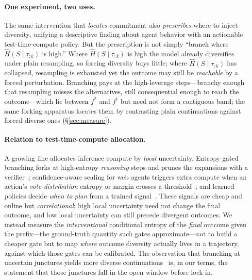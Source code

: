 \documentclass[11pt]{article}
\newcommand{\Hk}{\widehat{H}\!\left(S \mid \tau_{:k}\right)}
\begin{document}
\paragraph{One experiment, two uses.}
The same intervention that \emph{locates} commitment also \emph{prescribes} where
to inject diversity, unifying a descriptive finding about agent behavior with an
actionable test-time-compute policy. But the prescription is not simply ``branch
where $\Hk$ is high.'' Where $\Hk$ is high the model already diversifies under
plain resampling, so forcing diversity buys little; where $\Hk$ has collapsed,
resampling is exhausted yet the outcome may still be \emph{reachable} by a forced
perturbation. Branching pays at the high-leverage steps---branchy enough that
resampling misses the alternatives, still consequential enough to reach the
outcome---which lie between $f^\ast$ and $f^\dagger$ but need not form a contiguous
band; the same forking apparatus locates them by contrasting plain continuations
against forced-diverse ones
(\S\ref{sec:measure}).

\paragraph{Relation to test-time-compute allocation.}
A growing line allocates inference compute by \emph{local} uncertainty.
Entropy-gated branching forks at high-entropy \emph{reasoning} steps and prunes the
expansions with a verifier~\citep{egb2025}; confidence-aware scaling for web agents
triggers extra compute when an action's \emph{vote-distribution} entropy or margin
crosses a threshold~\citep{catts2026}; and learned policies decide \emph{when to
plan} from a trained signal~\citep{learnwhentoplan2025}. These signals are cheap and
online but \emph{correlational}: high local uncertainty need not change the final
outcome, and low local uncertainty can still precede divergent outcomes. We instead
measure the \emph{interventional} conditional entropy of the \emph{final} outcome
given the prefix---the ground-truth quantity such gates approximate---not to build a
cheaper gate but to map \emph{where} outcome diversity actually lives in a
trajectory, against which those gates can be calibrated. The observation that
branching at uncertain junctures yields more diverse continuations~\citep{egb2025}
is, in our terms, the statement that those junctures fall in the open window before
lock-in.
\end{document}

